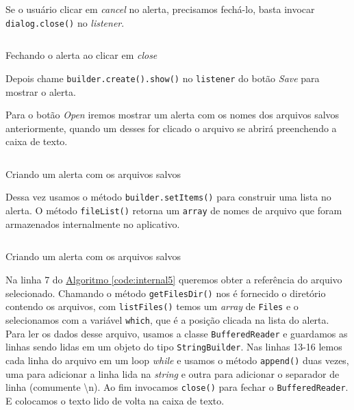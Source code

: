 \documentclass[a4paper,12pt,brazil,oneside]{book}
\begin{document}
\begin{singlespace}
		Se o usuário clicar em \emph{cancel} no alerta, precisamos fechá-lo, basta invocar \texttt{dialog.close()} no \emph{listener}.

		\begin{listing}[H]
		\inputminted[linenos=true,fontsize=\small,frame=lines, framesep=2mm, tabsize=2,numbersep=5pt]{java}{src/api/storage/internal3.java}
		\caption{Fechando o alerta ao clicar em \emph{close}}
		\label{code:internal3}
		\end{listing} 	

		Depois chame \texttt{builder.create().show()} no \texttt{listener} do botão \emph{Save} para mostrar o alerta.
 
		Para o botão \emph{Open} iremos mostrar um alerta com os nomes dos arquivos salvos anteriormente, quando um desses for clicado o arquivo se abrirá preenchendo a caixa de texto.

		\begin{listing}[H]
		\inputminted[linenos=true,fontsize=\small,frame=lines, framesep=2mm, tabsize=2,numbersep=5pt]{java}{src/api/storage/internal4.java}
		\caption{Criando um alerta com os arquivos salvos}
		\label{code:internal4}
		\end{listing} 	
	
		Dessa vez usamos o método \texttt{builder.setItems()} para construir uma lista no alerta. O método \texttt{fileList()} retorna um \texttt{array} de nomes de arquivo que foram armazenados internalmente no aplicativo. 

		\begin{listing}[H]
		\inputminted[linenos=true,fontsize=\small,frame=lines, framesep=2mm, tabsize=2,numbersep=5pt]{java}{src/api/storage/internal5.java}
		\caption{Criando um alerta com os arquivos salvos}
		\label{code:internal5}
		\end{listing} 	
		
		Na linha 7 do \hyperref[code:internal5]{Algoritmo \ref*{code:internal5}} queremos obter a referência do arquivo selecionado. Chamando o método \texttt{getFilesDir()} nos é fornecido o diretório contendo os arquivos, com \texttt{listFiles()} temos um \emph{array} de \texttt{Files} e o selecionamos com a variável \texttt{which}, que é a posição clicada na lista do alerta. Para ler os dados desse arquivo, usamos a classe \texttt{BufferedReader} e guardamos as linhas sendo lidas em um objeto do tipo \texttt{StringBuilder}. Nas linhas 13-16 lemos cada linha do arquivo em um loop \emph{while} e usamos o método \texttt{append()} duas vezes, uma para adicionar a linha lida na \emph{string} e outra para adicionar o separador de linha (comumente \textbackslash n). Ao fim invocamos \texttt{close()} para fechar o \texttt{BufferedReader}. E colocamos o texto lido de volta na caixa de texto.


\end{singlespace}
\end{document}
